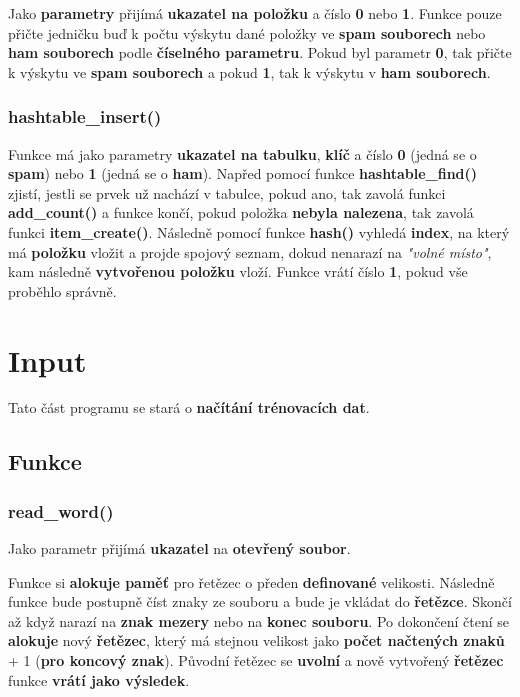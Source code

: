 \documentclass[12pt]{report}
\begin{document}
			Jako \textbf{parametry} přijímá \textbf{ukazatel na položku} a číslo \textbf{0} nebo \textbf{1}. Funkce pouze přičte jedničku buď k počtu výskytu dané položky ve \textbf{spam souborech} nebo \textbf{ham souborech} podle \textbf{číselného parametru}. Pokud byl parametr \textbf{0}, tak přičte k výskytu ve \textbf{spam souborech} a pokud \textbf{1}, tak k výskytu v \textbf{ham souborech}.
			
			\subsubsection{hashtable\_insert()}
			
			Funkce má jako parametry \textbf{ukazatel na tabulku}, \textbf{klíč} a číslo \textbf{0} (jedná se o \textbf{spam}) nebo \textbf{1} (jedná se o \textbf{ham}). Napřed pomocí funkce \textbf{hashtable\_find()} zjistí, jestli se prvek už nachází v tabulce, pokud ano, tak zavolá funkci \textbf{add\_count()} a funkce končí, pokud položka \textbf{nebyla nalezena}, tak zavolá funkci \textbf{item\_create()}. Následně pomocí funkce \textbf{hash()} vyhledá \textbf{index}, na který má \textbf{položku} vložit a projde spojový seznam, dokud nenarazí na \textit{"volné místo"}, kam následně \textbf{vytvořenou položku} vloží. Funkce vrátí číslo \textbf{1}, pokud vše proběhlo správně.
			
			
		\section{Input}
		
		Tato část programu se stará o \textbf{načítání trénovacích dat}.
		
		\subsection{Funkce}
		
			\subsubsection{read\_word()}
			
			Jako parametr přijímá \textbf{ukazatel} na \textbf{otevřený soubor}. 
			
			Funkce si \textbf{alokuje paměť} pro řetězec o předen \textbf{definované} velikosti. Následně funkce bude postupně číst znaky ze souboru a bude je vkládat do \textbf{řetězce}. Skončí až když narazí na \textbf{znak mezery} nebo na \textbf{konec souboru}. Po dokončení čtení se \textbf{alokuje} nový \textbf{řetězec}, který má stejnou velikost jako \textbf{počet načtených znaků} + 1 (\textbf{pro koncový znak}). Původní řetězec se \textbf{uvolní} a nově vytvořený \textbf{řetězec} funkce \textbf{vrátí jako výsledek}.
			
\end{document}
